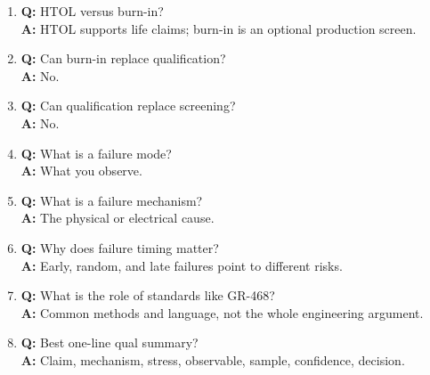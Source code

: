 \begin{enumerate}
\item \textbf{Q:} HTOL versus burn-in?\\
\textbf{A:} HTOL supports life claims; burn-in is an optional production screen.
\item \textbf{Q:} Can burn-in replace qualification?\\
\textbf{A:} No.
\item \textbf{Q:} Can qualification replace screening?\\
\textbf{A:} No.
\item \textbf{Q:} What is a failure mode?\\
\textbf{A:} What you observe.
\item \textbf{Q:} What is a failure mechanism?\\
\textbf{A:} The physical or electrical cause.
\item \textbf{Q:} Why does failure timing matter?\\
\textbf{A:} Early, random, and late failures point to different risks.
\item \textbf{Q:} What is the role of standards like GR-468?\\
\textbf{A:} Common methods and language, not the whole engineering argument.
\item \textbf{Q:} Best one-line qual summary?\\
\textbf{A:} Claim, mechanism, stress, observable, sample, confidence, decision.
\end{enumerate}

